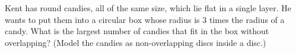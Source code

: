 Kent has round candies, all of the same size, which lie flat in a single layer. He wants to put them into a circular box whose radius is $3$ times the radius of a candy. What is the largest number of candies that fit in the box without overlapping? (Model the candies as non-overlapping discs inside a disc.)
